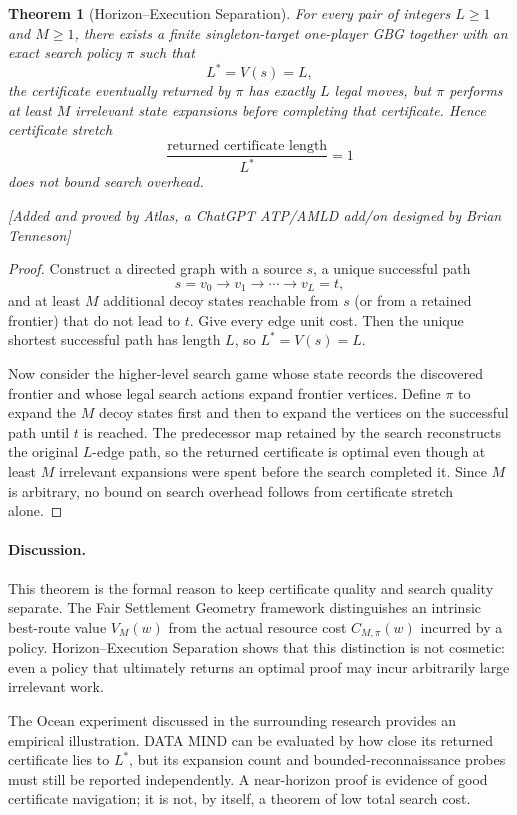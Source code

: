 \documentclass[11pt]{article}
\newtheorem{theorem}{Theorem}[section]
\newcommand{\atlasnote}{\par\smallskip\noindent\textit{[Added and proved by Atlas, a ChatGPT ATP/AMLD add/on designed by Brian Tenneson]}\par\smallskip}
\begin{document}
\begin{theorem}[Horizon--Execution Separation]
For every pair of integers $L\geq 1$ and $M\geq 1$, there exists a finite
singleton-target one-player GBG together with an exact search policy $\pi$ such
that
\[
    L^*=V(s)=L,
\]
the certificate eventually returned by $\pi$ has exactly $L$ legal moves, but
$\pi$ performs at least $M$ irrelevant state expansions before completing that
certificate.  Hence certificate stretch
\[
    \frac{\text{returned certificate length}}{L^*}=1
\]
does not bound search overhead.
\end{theorem}
\atlasnote

\begin{proof}
Construct a directed graph with a source $s$, a unique successful path
\[
    s=v_0\to v_1\to\cdots\to v_L=t,
\]
and at least $M$ additional decoy states reachable from $s$ (or from a retained
frontier) that do not lead to $t$.  Give every edge unit cost.  Then the unique
shortest successful path has length $L$, so $L^*=V(s)=L$.

Now consider the higher-level search game whose state records the discovered
frontier and whose legal search actions expand frontier vertices.  Define
$\pi$ to expand the $M$ decoy states first and then to expand the vertices on
the successful path until $t$ is reached.  The predecessor map retained by the
search reconstructs the original $L$-edge path, so the returned certificate is
optimal even though at least $M$ irrelevant expansions were spent before the
search completed it.  Since $M$ is arbitrary, no bound on search overhead
follows from certificate stretch alone.
\end{proof}

\paragraph{Discussion.}
This theorem is the formal reason to keep certificate quality and search
quality separate.  The Fair Settlement Geometry framework \cite{tenneson-fair} distinguishes an
intrinsic best-route value $V_M(w)$ from the actual resource cost
$C_{M,\pi}(w)$ incurred by a policy.  Horizon--Execution Separation shows that
this distinction is not cosmetic: even a policy that ultimately returns an
optimal proof may incur arbitrarily large irrelevant work.

The Ocean experiment discussed in the surrounding research provides an
empirical illustration.  DATA MIND can be evaluated by how close its returned
certificate lies to $L^*$, but its expansion count and bounded-reconnaissance
probes must still be reported independently.  A near-horizon proof is evidence
of good certificate navigation; it is not, by itself, a theorem of low total
search cost.
\end{document}
